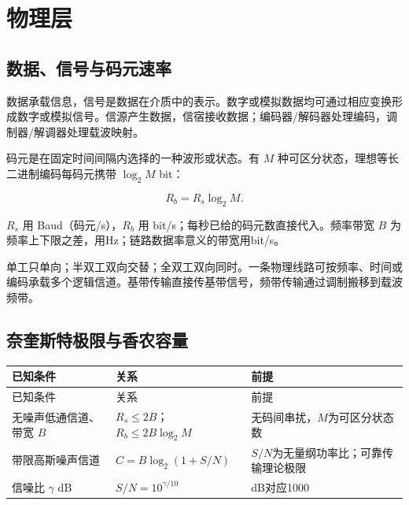 \chapter{物理层}\label{CN02}

\section{数据、信号与码元速率}\label{CN02-signal}

数据承载信息，信号是数据在介质中的表示。数字或模拟数据均可通过相应变换形成数字或模拟信号。信源产生数据，信宿接收数据；编码器/解码器处理编码，调制器/解调器处理载波映射。

码元是在固定时间间隔内选择的一种波形或状态。有 \(M\) 种可区分状态，理想等长二进制编码每码元携带 \(\log_2M\) bit：

\[R_b=R_s\log_2M.\]

\(R_s\) 用 Baud（码元/s），\(R_b\) 用 bit/s；每秒已给的码元数直接代入。频率带宽 \(B\) 为频率上下限之差，用Hz；链路数据率意义的带宽用bit/s。

单工只单向；半双工双向交替；全双工双向同时。一条物理线路可按频率、时间或编码承载多个逻辑信道。基带传输直接传基带信号，频带传输通过调制搬移到载波频带。

\section{奈奎斯特极限与香农容量}\label{CN02-capacity}

\par\smallskip
{\fontsize{9.3}{12}\selectfont\setlength{\tabcolsep}{2.5pt}\setlength{\LTleft}{0pt}\setlength{\LTright}{0pt}
\begin{longtable}{@{}>{\raggedright\arraybackslash}p{}>{\raggedright\arraybackslash}p{}>{\raggedright\arraybackslash}p{}@{}}
\toprule
已知条件 & 关系 & 前提 \\

\midrule\endfirsthead\toprule
已知条件 & 关系 & 前提 \\

\midrule\endhead\bottomrule\endfoot
无噪声低通信道、带宽 \(B\) & \(R_s\le2B\)；\(R_b\le2B\log_2M\) & 无码间串扰，\(M\)为可区分状态数 \\

带限高斯噪声信道 & \(C=B\log_2(1+S/N)\) & \(S/N\)为无量纲功率比；可靠传输理论极限 \\

信噪比 \(\gamma\) dB & \(S/N=10^{\gamma/10}\) & 30 dB对应1000 \\

\end{longtable}}
\par\smallskip

